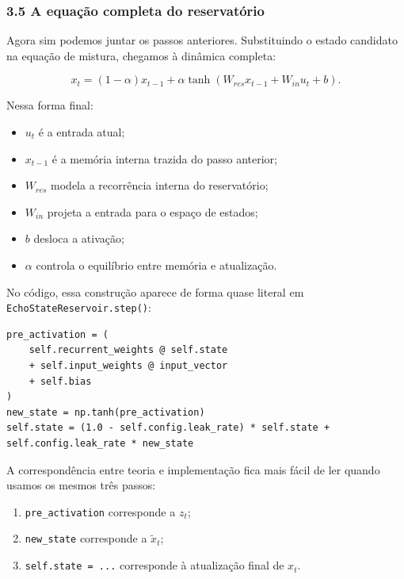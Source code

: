 \documentclass[12pt]{article}
\providecommand{\tightlist}{%
  \setlength{\itemsep}{0pt}\setlength{\parskip}{0pt}}
\begin{document}
\subsubsection{3.5 A equação completa do reservatório}\label{35-a-equauxe7uxe3o-completa-do-reservatuxf3rio}

Agora sim podemos juntar os passos anteriores. Substituindo o estado candidato na equação de mistura, chegamos à dinâmica completa:

\[
x_t = (1 - \alpha) x_{t-1} + \alpha \tanh(W_{res} x_{t-1} + W_{in} u_t + b).
\]

Nessa forma final:

\begin{itemize}
\tightlist
\item
  \(u_t\) é a entrada atual;
\item
  \(x_{t-1}\) é a memória interna trazida do passo anterior;
\item
  \(W_{res}\) modela a recorrência interna do reservatório;
\item
  \(W_{in}\) projeta a entrada para o espaço de estados;
\item
  \(b\) desloca a ativação;
\item
  \(\alpha\) controla o equilíbrio entre memória e atualização.
\end{itemize}

No código, essa construção aparece de forma quase literal em \texttt{EchoStateReservoir.step()}:

\begin{verbatim}
pre_activation = (
    self.recurrent_weights @ self.state
    + self.input_weights @ input_vector
    + self.bias
)
new_state = np.tanh(pre_activation)
self.state = (1.0 - self.config.leak_rate) * self.state + self.config.leak_rate * new_state
\end{verbatim}

A correspondência entre teoria e implementação fica mais fácil de ler quando usamos os mesmos três passos:

\begin{enumerate}
\def\labelenumi{\arabic{enumi}.}
\tightlist
\item
  \texttt{pre\_activation} corresponde a \(z_t\);
\item
  \texttt{new\_state} corresponde a \(\widetilde{x}_t\);
\item
  \texttt{self.state\ =\ ...} corresponde à atualização final de \(x_t\).
\end{enumerate}
\end{document}
